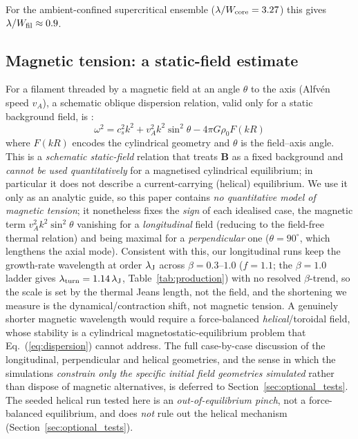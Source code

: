 \documentclass[usenatbib,twoside,twocolumn]{mnras}
\begin{document}
For the ambient-confined supercritical ensemble ($\lambda/W_{\rm core}=3.27$) this gives $\lambda/W_{\rm fil}\approx0.9$.

\subsection{Magnetic tension: a static-field estimate}
\label{sec:magnetic}

For a filament threaded by a magnetic field at an angle $\theta$ to the axis (Alfv\'en speed $v_A$), a schematic oblique dispersion relation, valid only for a static background field, is \citep{Nakamura1993}:
\begin{equation}
\omega^2 = c_s^2 k^2 + v_A^2 k^2 \sin^2\theta - 4\pi G\rho_0 F(kR)
\label{eq:dispersion}
\end{equation}
where $F(kR)$ encodes the cylindrical geometry and $\theta$ is the field--axis angle. This is a \emph{schematic static-field} relation that treats $\mathbf{B}$ as a fixed background and \emph{cannot be used quantitatively} for a magnetised cylindrical equilibrium; in particular it does not describe a current-carrying (helical) equilibrium. We use it only as an analytic guide, so this paper contains \emph{no quantitative model of magnetic tension}; it nonetheless fixes the \emph{sign} of each idealised case, the magnetic term $v_A^2k^2\sin^2\theta$ vanishing for a \emph{longitudinal} field (reducing to the field-free thermal relation) and being maximal for a \emph{perpendicular} one ($\theta=90^\circ$, which lengthens the axial mode). Consistent with this, our longitudinal runs keep the growth-rate wavelength at order $\lambda_{\rm J}$ across $\beta=0.3$--$1.0$ ($f=1.1$; the $\beta=1.0$ ladder gives $\lambda_{\rm turn}=1.14\,\lambda_{\rm J}$, Table~\ref{tab:production}) with no resolved $\beta$-trend, so the scale is set by the thermal Jeans length, not the field, and the shortening we measure is the dynamical/contraction shift, not magnetic tension. A genuinely shorter magnetic wavelength would require a force-balanced \emph{helical}/toroidal field, whose stability is a cylindrical magnetostatic-equilibrium problem that Eq.~(\ref{eq:dispersion}) cannot address. The full case-by-case discussion of the longitudinal, perpendicular and helical geometries, and the sense in which the simulations \emph{constrain only the specific initial field geometries simulated} rather than dispose of magnetic alternatives, is deferred to Section~\ref{sec:optional_tests}. The seeded helical run tested here is an \emph{out-of-equilibrium pinch}, not a force-balanced equilibrium, and does \emph{not} rule out the helical mechanism (Section~\ref{sec:optional_tests}).
\end{document}
